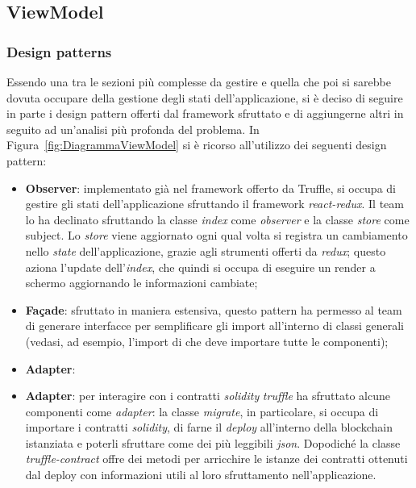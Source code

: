 
	
	\subsection{ViewModel}
		\subsubsection{Design patterns}
		Essendo una tra le sezioni più complesse da gestire e quella che poi si sarebbe dovuta occupare della gestione degli stati dell'applicazione, si è deciso di seguire in parte i design pattern offerti dal framework sfruttato e di aggiungerne altri in seguito ad un'analisi più profonda del problema.
		In Figura~\ref{fig:DiagrammaViewModel} si è ricorso all'utilizzo dei seguenti design pattern:
			\begin{itemize}
				\item \textbf{Observer}: implementato già nel framework offerto da Truffle, si occupa di gestire gli stati dell'applicazione sfruttando il framework \emph{react-redux}. Il team lo ha declinato sfruttando la classe \emph{index} come \emph{observer} e la classe \emph{store} come subject. Lo \emph{store} viene aggiornato ogni qual volta si registra un cambiamento nello \emph{state} dell'applicazione, grazie agli strumenti offerti da \emph{redux}; questo aziona l'update dell'\emph{index}, che quindi si occupa di eseguire un render a schermo aggiornando le informazioni cambiate;
				\item \textbf{Fa\c{c}ade}: sfruttato in maniera estensiva, questo pattern ha permesso al team di generare interfacce per semplificare gli import all'interno di classi generali (vedasi, ad esempio, l'import di  che deve importare tutte le componenti);
				\item \textbf{Adapter}:\item \textbf{Adapter}: per interagire con i contratti \emph{solidity} \emph{truffle} ha sfruttato alcune componenti come \emph{adapter}: la classe \emph{migrate}, in particolare, si occupa di importare i contratti \emph{solidity}, di farne il \emph{deploy} all'interno della blockchain istanziata e poterli sfruttare come dei più leggibili \emph{json}. Dopodiché la classe \emph{truffle-contract} offre dei metodi per arricchire le istanze dei contratti ottenuti dal deploy con informazioni utili al loro sfruttamento nell'applicazione.
			\end{itemize}
